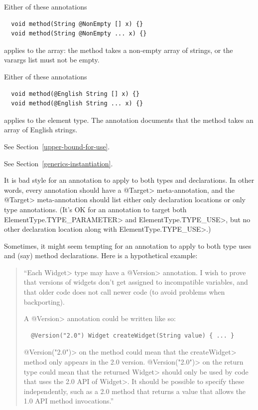 Either of these annotations

\begin{Verbatim}
  void method(String @NonEmpty [] x) {}
  void method(String @NonEmpty ... x) {}
\end{Verbatim}

\noindent
applies to the array:  the method takes a non-empty array of strings, or
the varargs list must not be empty.

Either of these annotations

\begin{Verbatim}
  void method(@English String [] x) {}
  void method(@English String ... x) {}
\end{Verbatim}

\noindent
applies to the element type. The annotation documents that the method takes an array of English strings.



See Section~\ref{upper-bound-for-use}.



See Section~\ref{generics-instantiation}.



It is bad style for an annotation to apply to both types and declarations.
In other words, every annotation should have a \<@Target> meta-annotation,
and the \<@Target> meta-annotation should list either only declaration
locations or only type annotations.  (It's OK for an annotation to target
both \<ElementType.TYPE\_PARAMETER> and \<ElementType.TYPE\_USE>, but no
other declaration location along with \<ElementType.TYPE\_USE>.)

Sometimes, it might seem tempting for an annotation to apply to both type
uses and (say) method declarations.  Here is a hypothetical example:

\begin{quote}
  ``Each \<Widget> type may have a \<@Version> annotation.
  I wish to prove that versions of widgets don't get assigned to
  incompatible variables, and that older code does not call newer code (to
  avoid problems when backporting).

  A \<@Version> annotation could be written like so:

\begin{Verbatim}
  @Version("2.0") Widget createWidget(String value) { ... }
\end{Verbatim}

\<@Version("2.0")> on the method could mean that the \<createWidget> method
only appears in the 2.0 version.  \<@Version("2.0")> on the return type
could mean that the returned \<Widget> should only be used by code that
uses the 2.0 API of \<Widget>.  It should be possible to specify these
independently, such as a 2.0 method that returns a value that allows the
1.0 API method invocations.''
\end{quote}

